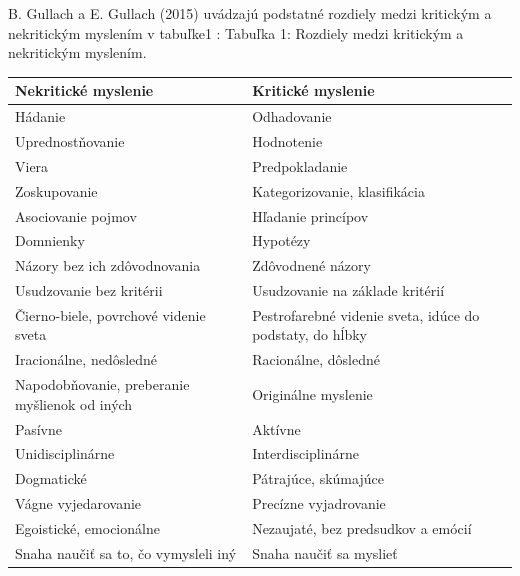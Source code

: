 \documentclass[10pt,oneside,slovak,a4paper]{article}
\begin{document}
B. Gullach a E. Gullach (2015) uvádzajú podstatné rozdiely medzi kritickým
a nekritickým myslením v tabuľke1 :
Tabuľka 1: Rozdiely medzi kritickým a nekritickým myslením.
\begin{table}[]
\begin{tabular}{|l|l|}
\hline
\textbf{Nekritické myslenie}                  & \textbf{Kritické myslenie}                               \\ \hline
Hádanie                                       & Odhadovanie                                              \\ \hline
Uprednostňovanie                              & Hodnotenie                                               \\ \hline
Viera                                         & Predpokladanie                                           \\ \hline
Zoskupovanie                                  & Kategorizovanie, klasifikácia                            \\ \hline
Asociovanie pojmov                            & Hľadanie princípov                                       \\ \hline
Domnienky                                     & Hypotézy                                                 \\ \hline
Názory bez ich zdôvodnovania                  & Zdôvodnené názory                                        \\ \hline
Usudzovanie bez kritérii                      & Usudzovanie na základe kritérií                          \\ \hline
Čierno-biele, povrchové videnie sveta         & Pestrofarebné videnie sveta, idúce do podstaty, do hĺbky \\ \hline
Iracionálne, nedôsledné                       & Racionálne, dôsledné                                     \\ \hline
Napodobňovanie, preberanie myšlienok od iných & Originálne myslenie                                      \\ \hline
Pasívne                                       & Aktívne                                                  \\ \hline
Unidisciplinárne                              & Interdisciplinárne                                       \\ \hline
Dogmatické                                    & Pátrajúce, skúmajúce                                     \\ \hline
Vágne vyjedarovanie                           & Precízne vyjadrovanie                                    \\ \hline
Egoistické, emocionálne                       & Nezaujaté, bez predsudkov a emócií                       \\ \hline
Snaha naučiť sa to, čo vymysleli iný          & Snaha naučiť sa myslieť                                  \\ \hline
\end{tabular}
\end{table}
\end{document}

